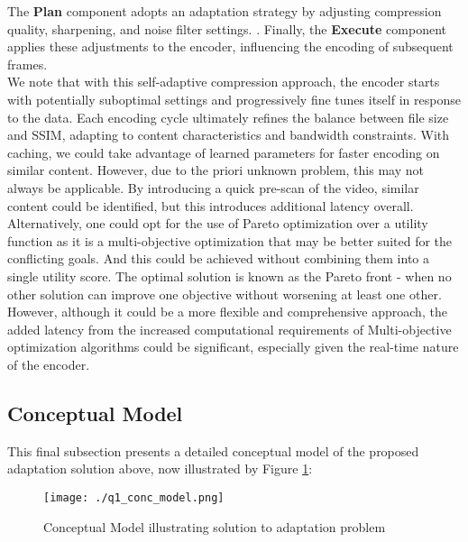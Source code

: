\documentclass[conference]{IEEEtran}
\begin{document}
The \textbf{Plan} component adopts an adaptation strategy by adjusting compression quality, sharpening, and noise filter settings. \cite{SAVE_pdf}. Finally, the \textbf{Execute} component applies these adjustments to the encoder, influencing the encoding of subsequent frames.\\

We note that with this self-adaptive compression approach, the encoder starts with potentially suboptimal settings and progressively fine tunes itself in response to the data. Each encoding cycle ultimately refines the balance between file size and SSIM, adapting to content characteristics and bandwidth constraints. With caching, we could take advantage of learned parameters for faster encoding on similar content. However, due to the priori unknown problem, this may not always be applicable. By introducing a quick pre-scan of the video, similar content could be identified, but this introduces additional latency overall.\\

Alternatively, one could opt for the use of Pareto optimization over a utility function as it is a multi-objective optimization that may be better suited for the conflicting goals. And this could be achieved without combining them into a single utility score. The optimal solution is known as the Pareto front - when no other solution can improve one objective without worsening at least one other. However, although it could be a more flexible and comprehensive approach, the added latency from the increased computational requirements of Multi-objective optimization algorithms could be significant, especially given the real-time nature of the encoder.

\subsection{\textbf{Conceptual Model}}
This final subsection presents a detailed conceptual model of the proposed adaptation solution above, now illustrated by Figure \ref{fig:q1_conc_model}:

\begin{figure}[H]
	\centering
	\texttt{[image: ./q1\_conc\_model.png]}
	\caption{Conceptual Model illustrating solution to adaptation problem}
	\label{fig:q1_conc_model}
\end{figure}
\end{document}
